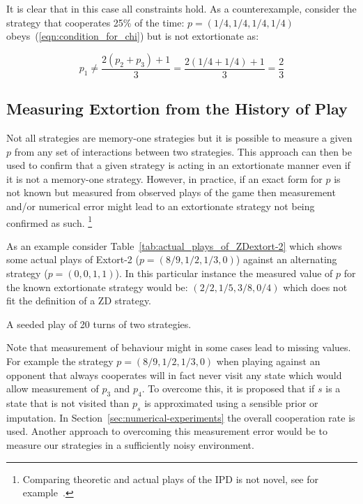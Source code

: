 \documentclass[a4paper]{article}
\begin{document}
It is clear that in this case all constraints hold. As a counterexample,
consider the strategy that cooperates 25\% of the time: \(p=(1 /4, 1 / 4, 1 / 4,
1 / 4)\) obeys~(\ref{eqn:condition_for_chi}) but is not extortionate as:

\begin{equation}
    p_1 \ne \frac{2(p_2 + p_3) + 1}{3}
        = \frac{2(1 / 4 + 1 / 4) + 1}{3}
        = \frac{2}{3}
\end{equation}

\subsection{Measuring Extortion from the History of Play}

Not all strategies are memory-one strategies but it is possible to
measure a given \(p\) from any set of interactions between two strategies.
This approach can then be used to confirm that a given strategy is acting
in an extortionate manner even if it is not a memory-one strategy. However, in
practice, if an exact form for \(p\) is not known but measured from observed
plays of the game then measurement and/or numerical error might lead to an
extortionate strategy not being confirmed as such. \footnote{Comparing theoretic
and actual plays of the IPD is not novel, see for example~\cite{Rand2013}.}


As an example consider Table~\ref{tab:actual_plays_of_ZDextort-2} which shows
some actual plays of Extort-2 (\(p=(8 / 9, 1 / 2, 1 / 3, 0)\)) against an
alternating strategy (\(p=(0, 0, 1, 1)\)). In this particular instance the
measured value of \(p\) for the known extortionate strategy would be:
\((2/2, 1/5, 3/8, 0/4)\) which does not fit the definition of a ZD strategy.


\begin{table}[!hbtp]
    
    \caption{A seeded play of 20 turns of two strategies.}
    \label{tab:actual_plays_of_ZDextort-2}
\end{table}


Note that measurement of behaviour might in some cases lead to missing values.
For example the strategy \(p=(8 / 9, 1 / 2, 1 / 3, 0)\) when playing against an
opponent that always cooperates will in fact never visit any state which would
allow measurement of
\(p_3\) and \(p_4\). To overcome this, it is proposed that if \(s\) is a state
that is not visited than \(p_s\) is approximated using a sensible prior or
imputation. In Section~\ref{sec:numerical-experiments} the overall cooperation
rate is used. Another approach to overcoming this measurement error would be to
measure our strategies in a sufficiently noisy environment.
\end{document}
